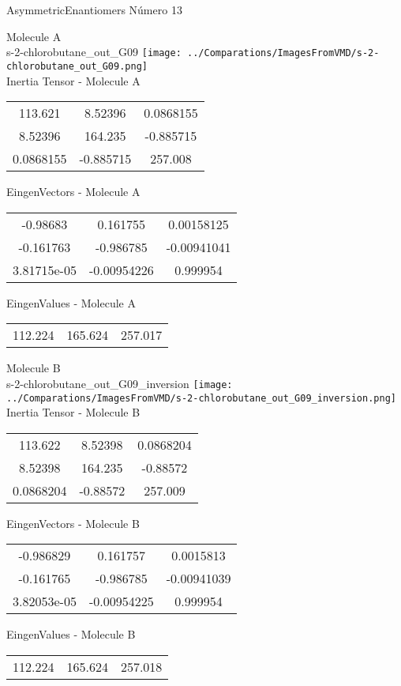 \vtab[-2cm]
\begin{center}
{\large AsymmetricEnantiomers \tab Número 13}
\end{center}
\begin{multicols}{2}
\begin{center}

Molecule A \\ 
s-2-chlorobutane\_out\_G09
\texttt{[image: ../Comparations/ImagesFromVMD/s-2-chlorobutane\_out\_G09.png]}
\\
Inertia Tensor - Molecule A \\
\vtab

\begin{tabular}{|c c c|}
113.621	 & 	8.52396	 & 	0.0868155	 \\
8.52396	 & 	164.235	 & 	-0.885715	 \\
0.0868155	 & 	-0.885715	 & 	257.008
\end{tabular}

\vtab
 EingenVectors - Molecule A     \\
\vtab
\begin{tabular}{|c c c|}
-0.98683	 & 	0.161755	 & 	0.00158125	 \\
-0.161763	 & 	-0.986785	 & 	-0.00941041	 \\
3.81715e-05	 & 	-0.00954226	 & 	0.999954
\end{tabular}

\vtab
 EingenValues - Molecule A     \\
\vtab
\begin{tabular}{|c c c|}
112.224	 & 	165.624	 & 	257.017	 \\
\end{tabular}
\columnbreak

Molecule B \\ 
s-2-chlorobutane\_out\_G09\_inversion
\texttt{[image: ../Comparations/ImagesFromVMD/s-2-chlorobutane\_out\_G09\_inversion.png]}
\\
Inertia Tensor - Molecule B \\
\vtab

\begin{tabular}{|c c c|}
113.622	 & 	8.52398	 & 	0.0868204	 \\
8.52398	 & 	164.235	 & 	-0.88572	 \\
0.0868204	 & 	-0.88572	 & 	257.009
\end{tabular}

\vtab
 EingenVectors - Molecule B     \\
\vtab
\begin{tabular}{|c c c|}
-0.986829	 & 	0.161757	 & 	0.0015813	 \\
-0.161765	 & 	-0.986785	 & 	-0.00941039	 \\
3.82053e-05	 & 	-0.00954225	 & 	0.999954
\end{tabular}

\vtab
 EingenValues - Molecule B     \\
\vtab
\begin{tabular}{|c c c|}
112.224	 & 	165.624	 & 	257.018	 \\
\end{tabular}

\end{center}
\end{multicols}
